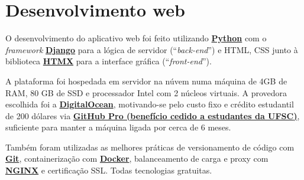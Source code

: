\section{Desenvolvimento web}

O desenvolvimento do aplicativo web foi feito utilizando \href{https://www.python.org/}{\textbf{Python}} com o \textit{framework} \href{https://www.djangoproject.com/}{\textbf{Django}} para a lógica de servidor (“\textit{back-end}”) e \gls{HTML}, \gls{CSS} junto à biblioteca \href{https://htmx.org/}{\textbf{HTMX}} para a interface gráfica (“\textit{front-end}”).

A plataforma foi hospedada em servidor na núvem numa máquina de 4GB de \gls{RAM}, 80 GB de \gls{SSD} e processador Intel com 2 núcleos virtuais. A provedora escolhida foi a \href{https://www.digitalocean.com/}{\textbf{DigitalOcean}}, motivando-se pelo custo fixo e crédito estudantil de 200 dólares via \href{https://education.github.com/pack}{\textbf{GitHub Pro (benefício cedido a estudantes da UFSC)}}, suficiente para manter a máquina ligada por cerca de 6 meses.

Também foram utilizadas as melhores práticas de versionamento de código com \href{https://git-scm.com/}{\textbf{Git}}, containerização com \href{https://www.docker.com/}{\textbf{Docker}}, balanceamento de carga e proxy com \href{https://www.nginx.com/}{\textbf{NGINX}} e certificação \gls{SSL}. Todas tecnologias gratuitas.
